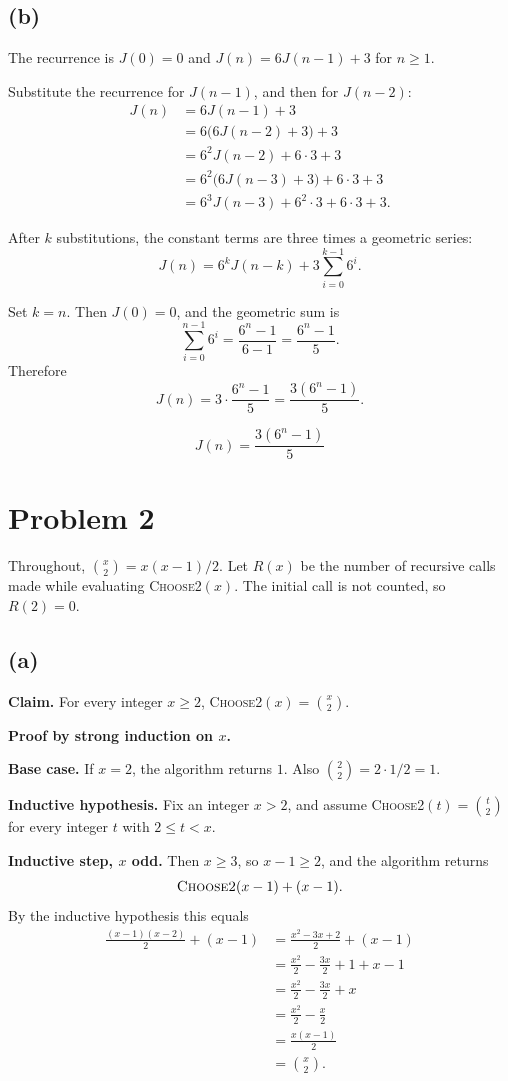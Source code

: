 \documentclass[11pt]{article}
\begin{document}
\subsection*{(b)}

The recurrence is $J(0)=0$ and $J(n)=6J(n-1)+3$ for $n\ge 1$.

Substitute the recurrence for $J(n-1)$, and then for $J(n-2)$:
\begin{align*}
J(n)
&= 6J(n-1)+3\\
&= 6\bigl(6J(n-2)+3\bigr)+3\\
&= 6^{2}J(n-2)+6\cdot 3+3\\
&= 6^{2}\bigl(6J(n-3)+3\bigr)+6\cdot 3+3\\
&= 6^{3}J(n-3)+6^{2}\cdot 3+6\cdot 3+3.
\end{align*}

After $k$ substitutions, the constant terms are three times a geometric series:
\[
J(n)=6^{k}J(n-k)+3\sum_{i=0}^{k-1}6^{i}.
\]

Set $k=n$. Then $J(0)=0$, and the geometric sum is
\[
\sum_{i=0}^{n-1}6^{i}=\frac{6^{n}-1}{6-1}=\frac{6^{n}-1}{5}.
\]
Therefore
\[
J(n)=3\cdot\frac{6^{n}-1}{5}=\frac{3(6^{n}-1)}{5}.
\]

\[
\boxed{J(n)=\dfrac{3(6^{n}-1)}{5}}
\]

\section*{Problem 2}

Throughout, $\binom{x}{2}=x(x-1)/2$. Let $R(x)$ be the number of recursive calls made while evaluating \textsc{Choose2}$(x)$. The initial call is not counted, so $R(2)=0$.

\subsection*{(a)}

\textbf{Claim.} For every integer $x\ge 2$, \textsc{Choose2}$(x)=\binom{x}{2}$.

\textbf{Proof by strong induction on $x$.}

\textbf{Base case.} If $x=2$, the algorithm returns $1$. Also $\binom{2}{2}=2\cdot 1/2=1$.

\textbf{Inductive hypothesis.} Fix an integer $x>2$, and assume \textsc{Choose2}$(t)=\binom{t}{2}$ for every integer $t$ with $2\le t<x$.

\textbf{Inductive step, $x$ odd.} Then $x\ge 3$, so $x-1\ge 2$, and the algorithm returns
\[
\textsc{Choose2}(x-1)+(x-1).
\]
By the inductive hypothesis this equals
\begin{align*}
\frac{(x-1)(x-2)}{2}+(x-1)
&= \frac{x^{2}-3x+2}{2}+(x-1)\\
&= \frac{x^{2}}{2}-\frac{3x}{2}+1+x-1\\
&= \frac{x^{2}}{2}-\frac{3x}{2}+x\\
&= \frac{x^{2}}{2}-\frac{x}{2}\\
&= \frac{x(x-1)}{2}\\
&= \binom{x}{2}.
\end{align*}
\end{document}
